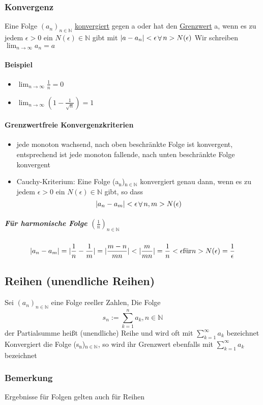 \documentclass[a4paper]{scrartcl}
\DeclarePairedDelimiter\abs{\lvert}{\rvert}%
\DeclareMathOperator{\Forall}{\forall}
\begin{document}
\subsubsection{Konvergenz}
\label{sec-3-1-6}
Eine Folge $(a_n)_{n\in\mathbb{N}}$ \uline{konvergiert} gegen a oder hat den \uline{Grenzwert} a, wenn es zu jedem $\epsilon > 0$ ein $N(\epsilon)\in\mathbb{N}$ gibt mit $\abs{a-a_n} < \epsilon \Forall n > N(\epsilon)$
Wir schreiben $\lim_{n\to\infty}a_n = a$
\paragraph{Beispiel}
\label{sec-3-1-6-1}
\begin{itemize}
\item $\lim_{n\to\infty}\frac{1}{n} = 0$
\item $\lim_{n\to\infty}(1-\frac{1}{\sqrt{n}}) = 1$
\end{itemize}
\paragraph{Grenzwertfreie Konvergenzkriterien}
\label{sec-3-1-6-2}
\begin{itemize}
\item jede monoton wachsend, nach oben beschränkte Folge ist konvergent, entsprechend ist jede monoton fallende, nach unten beschränkte Folge konvergent
\item Cauchy-Kriterium: Eine Folge (a$_{\text{n}}$)$_{\text{n}\in\mathbb{N}}$ konvergiert genau dann, wenn es zu jedem $\epsilon > 0$ ein  $N(\epsilon)\in\mathbb{N}$ gibt, so dass \[\abs{a_n - a_m} < \epsilon\Forall n,m > N(\epsilon)\]
\end{itemize}
\subparagraph{Für harmonische Folge $(\frac{1}{n})_{n\in\mathbb{N}}$}
\label{sec-3-1-6-2-1}
\[\abs{a_n - a_m} = \abs{\frac{1}{n} - \frac{1}{m}} = \abs{\frac{m-n}{m n}} < \abs{\frac{m}{m n}} = \frac{1}{n} < \epsilon \text{für} n > N(\epsilon) = \frac{1}{\epsilon}\]
\subsection{Reihen (unendliche Reihen)}
\label{sec-3-2}
Sei $(a_n)_{n\in\mathbb{N}}$ eine Folge reeller Zahlen, Die Folge \[s_n := \sum_{k=1}^n a_k, n\in\mathbb{N}\] der Partialsumme heißt (unendliche) Reihe und wird oft mit $\sum_{k=1}^\infty a_k$ bezeichnet
Konvergiert die Folge (s$_{\text{n}}$)$_{\text{n}\in\mathbb{N}}$, so wird ihr Grenzwert ebenfalls mit $\sum_{k=1}^\infty a_k$ bezeichnet
\subsubsection{Bemerkung}
\label{sec-3-2-1}
Ergebnisse für Folgen gelten auch für Reihen
\end{document}
